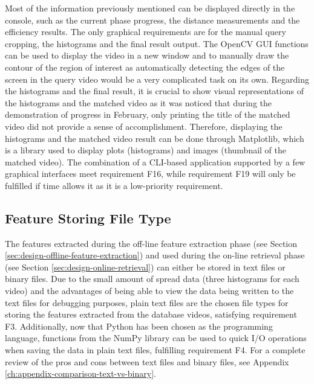 Most of the information previously mentioned can be displayed directly in the console, such as the current phase progress, the distance measurements and the efficiency results. The only graphical requirements are for the manual query cropping, the histograms and the final result output. The OpenCV GUI functions can be used to display the video in a new window and to manually draw the contour of the region of interest as automatically detecting the edges of the screen in the query video would be a very complicated task on its own. Regarding the histograms and the final result, it is crucial to show visual representations of the histograms and the matched video as it was noticed that during the demonstration of progress in February, only printing the title of the matched video did not provide a sense of accomplishment. Therefore, displaying the histograms and the matched video result can be done through Matplotlib, which is a library used to display plots (histograms) and images (thumbnail of the matched video). The combination of a CLI-based application supported by a few graphical interfaces meet requirement F16, while requirement F19 will only be fulfilled if time allows it as it is a low-priority requirement.


\subsection{Feature Storing File Type}
\label{sec:design-feature-storing-file-type}

The features extracted during the off-line feature extraction phase (see Section \ref{sec:design-offline-feature-extraction}) and used during the on-line retrieval phase (see Section \ref{sec:design-online-retrieval}) can either be stored in text files or binary files. Due to the small amount of spread data (three histograms for each video) and the advantages of being able to view the data being written to the text files for debugging purposes, plain text files are the chosen file types for storing the features extracted from the database videos, satisfying requirement F3. Additionally, now that Python has been chosen as the programming language, functions from the NumPy library can be used to quick I/O operations when saving the data in plain text files, fulfilling requirement F4. For a complete review of the pros and cons between text files and binary files, see Appendix \ref{ch:appendix-comparison-text-vs-binary}.

